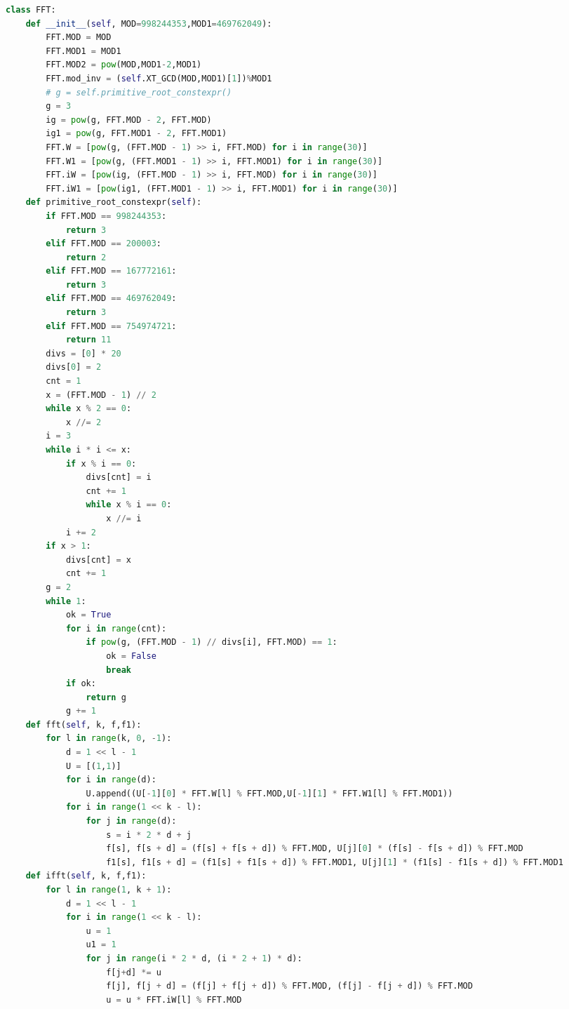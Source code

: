 \documentclass[10pt,landscape, a4paper]{article}
\begin{document}
\begin{multicols*}{3}
\begin{lstlisting}[language=Python]
class FFT:
    def __init__(self, MOD=998244353,MOD1=469762049):
        FFT.MOD = MOD
        FFT.MOD1 = MOD1
        FFT.MOD2 = pow(MOD,MOD1-2,MOD1)
        FFT.mod_inv = (self.XT_GCD(MOD,MOD1)[1])%MOD1
        # g = self.primitive_root_constexpr()
        g = 3
        ig = pow(g, FFT.MOD - 2, FFT.MOD)
        ig1 = pow(g, FFT.MOD1 - 2, FFT.MOD1)
        FFT.W = [pow(g, (FFT.MOD - 1) >> i, FFT.MOD) for i in range(30)]
        FFT.W1 = [pow(g, (FFT.MOD1 - 1) >> i, FFT.MOD1) for i in range(30)]
        FFT.iW = [pow(ig, (FFT.MOD - 1) >> i, FFT.MOD) for i in range(30)]
        FFT.iW1 = [pow(ig1, (FFT.MOD1 - 1) >> i, FFT.MOD1) for i in range(30)]
    def primitive_root_constexpr(self):
        if FFT.MOD == 998244353:
            return 3
        elif FFT.MOD == 200003:
            return 2
        elif FFT.MOD == 167772161:
            return 3
        elif FFT.MOD == 469762049:
            return 3
        elif FFT.MOD == 754974721:
            return 11
        divs = [0] * 20
        divs[0] = 2
        cnt = 1
        x = (FFT.MOD - 1) // 2
        while x % 2 == 0:
            x //= 2
        i = 3
        while i * i <= x:
            if x % i == 0:
                divs[cnt] = i
                cnt += 1
                while x % i == 0:
                    x //= i
            i += 2
        if x > 1:
            divs[cnt] = x
            cnt += 1
        g = 2
        while 1:
            ok = True
            for i in range(cnt):
                if pow(g, (FFT.MOD - 1) // divs[i], FFT.MOD) == 1:
                    ok = False
                    break
            if ok:
                return g
            g += 1
    def fft(self, k, f,f1):
        for l in range(k, 0, -1):
            d = 1 << l - 1
            U = [(1,1)]
            for i in range(d):
                U.append((U[-1][0] * FFT.W[l] % FFT.MOD,U[-1][1] * FFT.W1[l] % FFT.MOD1))
            for i in range(1 << k - l):
                for j in range(d):
                    s = i * 2 * d + j
                    f[s], f[s + d] = (f[s] + f[s + d]) % FFT.MOD, U[j][0] * (f[s] - f[s + d]) % FFT.MOD
                    f1[s], f1[s + d] = (f1[s] + f1[s + d]) % FFT.MOD1, U[j][1] * (f1[s] - f1[s + d]) % FFT.MOD1
    def ifft(self, k, f,f1):
        for l in range(1, k + 1):
            d = 1 << l - 1
            for i in range(1 << k - l):
                u = 1
                u1 = 1
                for j in range(i * 2 * d, (i * 2 + 1) * d):
                    f[j+d] *= u
                    f[j], f[j + d] = (f[j] + f[j + d]) % FFT.MOD, (f[j] - f[j + d]) % FFT.MOD
                    u = u * FFT.iW[l] % FFT.MOD

\end{lstlisting}
\end{multicols*}
\end{document}
